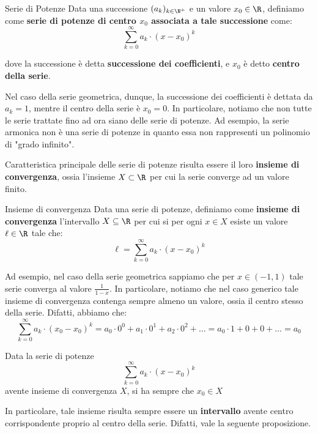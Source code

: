 \documentclass[a4paper, 12pt]{report}
\begin{document}
    \begin{frameddefn}{Serie di Potenze}
        Data una successione $(a_k)_{k \in \N^+}$ e un valore $x_0 \in \R$, definiamo come \textbf{serie di potenze di centro $x_0$ associata a tale successione} come:
        \[\sum_{k = 0}^{\infty} a_k \cdot (x-x_0)^k\]
        
        dove la successione è detta \textbf{successione dei coefficienti}, e $x_0$ è detto \textbf{centro della serie}.
    \end{frameddefn}

    Nel caso della serie geometrica, dunque, la successione dei coefficienti è dettata da $a_k = 1$, mentre il centro della serie è $x_0 = 0$. In particolare, notiamo che non tutte le serie trattate fino ad ora siano delle serie di potenze. Ad esempio, la serie armonica non è una serie di potenze in quanto essa non rappresenti un polinomio di "grado infinito".

    Caratteristica principale delle serie di potenze risulta essere il loro \textbf{insieme di convergenza}, ossia l'insieme $X \subset \R$ per cui la serie converge ad un valore finito.

    \begin{frameddefn}{Insieme di convergenza}
        Data una serie di potenze, definiamo come \textbf{insieme di convergenza} l'intervallo $X \subseteq \R$ per cui si per ogni $x \in X$ esiste un valore $\ell \in \R$ tale che:
        \[\ell = \sum_{k = 0}^{\infty} a_k \cdot (x-x_0)^k\]
    \end{frameddefn}

    Ad esempio, nel caso della serie geometrica sappiamo che per $x \in (-1, 1)$ tale serie converga al valore $\frac{1}{1-x}$. In particolare, notiamo che nel caso generico tale insieme di convergenza contenga sempre almeno un valore, ossia il centro stesso della serie. Difatti, abbiamo che:
    \[\sum_{k = 0}^{\infty} a_k \cdot (x_0-x_0)^k = a_0 \cdot 0^0 + a_1 \cdot 0^1 + a_2 \cdot 0^2 + \ldots = a_0 \cdot 1 + 0 + 0 + \ldots = a_0\]

    \begin{framedobs}{}
        Data la serie di potenze
        \[\sum_{k = 0}^{\infty} a_k \cdot (x-x_0)^k\]
        avente insieme di convergenza $X$, si ha sempre che $x_0 \in X$
    \end{framedobs}

    In particolare, tale insieme risulta sempre essere un \textbf{intervallo} avente centro corrispondente proprio al centro della serie. Difatti, vale la seguente proposizione.
\end{document}
